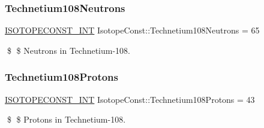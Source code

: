 \subsubsection{\texorpdfstring{Technetium108\+Neutrons}{Technetium108Neutrons}}
{\footnotesize\ttfamily \mbox{\hyperlink{group___isotope_const-_macros_ga5f18360b3e99483a35c32d789e62621c}{I\+S\+O\+T\+O\+P\+E\+C\+O\+N\+S\+T\+\_\+\+I\+NT}} Isotope\+Const\+::\+Technetium108\+Neutrons = 65}

\$ \$ Neutrons in Technetium-\/108. \mbox{\label{group___isotope_const-_technetium-_tc108_ga34191ea8832dfea0f58f8a1844e327b4}} 
\subsubsection{\texorpdfstring{Technetium108\+Protons}{Technetium108Protons}}
{\footnotesize\ttfamily \mbox{\hyperlink{group___isotope_const-_macros_ga5f18360b3e99483a35c32d789e62621c}{I\+S\+O\+T\+O\+P\+E\+C\+O\+N\+S\+T\+\_\+\+I\+NT}} Isotope\+Const\+::\+Technetium108\+Protons = 43}

\$ \$ Protons in Technetium-\/108. 